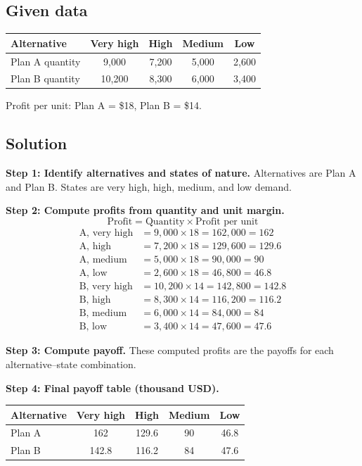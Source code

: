 \begin{ExamProblems}
		\subsection*{Given data}
		\begin{center}
			\begin{tabular}{l c c c c}
				\toprule
				Alternative & Very high & High & Medium & Low \\
				\midrule
				Plan A quantity & 9{,}000 & 7{,}200 & 5{,}000 & 2{,}600 \\
				Plan B quantity & 10{,}200 & 8{,}300 & 6{,}000 & 3{,}400 \\
				\bottomrule
			\end{tabular}
		\end{center}
		Profit per unit: Plan A = \$18, Plan B = \$14.
		
		\subsection*{Solution}
		\textbf{Step 1: Identify alternatives and states of nature.} Alternatives are Plan A and Plan B. States are very high, high, medium, and low demand.
		
		\textbf{Step 2: Compute profits from quantity and unit margin.}
		\[
		\text{Profit} = \text{Quantity} \times \text{Profit per unit}
		\]
		\[
		\begin{aligned}
		\text{A, very high} &= 9{,}000 \times 18 = 162{,}000 = 162 \\
		\text{A, high} &= 7{,}200 \times 18 = 129{,}600 = 129.6 \\
		\text{A, medium} &= 5{,}000 \times 18 = 90{,}000 = 90 \\
		\text{A, low} &= 2{,}600 \times 18 = 46{,}800 = 46.8 \\
		\text{B, very high} &= 10{,}200 \times 14 = 142{,}800 = 142.8 \\
		\text{B, high} &= 8{,}300 \times 14 = 116{,}200 = 116.2 \\
		\text{B, medium} &= 6{,}000 \times 14 = 84{,}000 = 84 \\
		\text{B, low} &= 3{,}400 \times 14 = 47{,}600 = 47.6
		\end{aligned}
		\]
		
		\textbf{Step 3: Compute payoff.} These computed profits are the payoffs for each alternative--state combination.
		
		\textbf{Step 4: Final payoff table (thousand USD).}
		\begin{center}
			\begin{tabular}{l c c c c}
				\toprule
				Alternative & Very high & High & Medium & Low \\
				\midrule
				Plan A & 162 & 129.6 & 90 & 46.8 \\
				Plan B & 142.8 & 116.2 & 84 & 47.6 \\
				\bottomrule
			\end{tabular}
		\end{center}
		

\end{ExamProblems}
